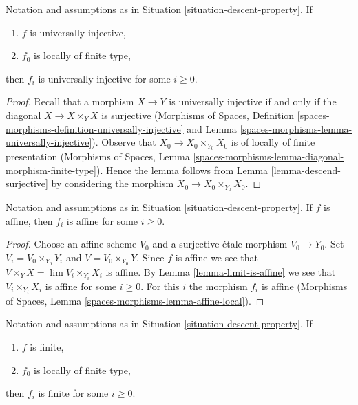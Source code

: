 \begin{lemma}
\label{lemma-descend-universally-injective}
Notation and assumptions as in Situation \ref{situation-descent-property}. If
\begin{enumerate}
\item $f$ is universally injective,
\item $f_0$ is locally of finite type,
\end{enumerate}
then $f_i$ is universally injective for some $i \geq 0$.
\end{lemma}

\begin{proof}
Recall that a morphism $X \to Y$ is universally injective if and
only if the diagonal $X \to X \times_Y X$ is surjective
(Morphisms of Spaces, Definition
\ref{spaces-morphisms-definition-universally-injective} and
Lemma \ref{spaces-morphisms-lemma-universally-injective}).
Observe that $X_0 \to X_0 \times_{Y_0} X_0$ is of locally of finite
presentation (Morphisms of Spaces, Lemma
\ref{spaces-morphisms-lemma-diagonal-morphism-finite-type}).
Hence the lemma follows from Lemma \ref{lemma-descend-surjective}
by considering the morphism $X_0 \to X_0 \times_{Y_0} X_0$.
\end{proof}

\begin{lemma}
\label{lemma-descend-affine}
Notation and assumptions as in Situation \ref{situation-descent-property}. If
$f$ is affine, then $f_i$ is affine for some $i \geq 0$.
\end{lemma}

\begin{proof}
Choose an affine scheme $V_0$ and a surjective \'etale morphism $V_0 \to Y_0$.
Set $V_i = V_0 \times_{Y_0} Y_i$ and $V = V_0 \times_{Y_0} Y$.
Since $f$ is affine we see that $V \times_Y X = \lim V_i \times_{Y_i} X_i$
is affine. By Lemma \ref{lemma-limit-is-affine} we see that
$V_i \times_{Y_i} X_i$ is affine for some $i \geq 0$. For this $i$ the morphism
$f_i$ is affine
(Morphisms of Spaces, Lemma \ref{spaces-morphisms-lemma-affine-local}).
\end{proof}

\begin{lemma}
\label{lemma-descend-finite}
Notation and assumptions as in Situation \ref{situation-descent-property}. If
\begin{enumerate}
\item $f$ is finite,
\item $f_0$ is locally of finite type,
\end{enumerate}
then $f_i$ is finite for some $i \geq 0$.
\end{lemma}

